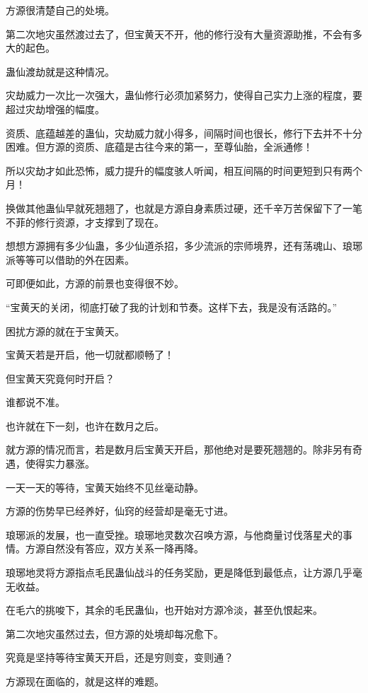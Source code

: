 \begin{this_body}
方源很清楚自己的处境。

第二次地灾虽然渡过去了，但宝黄天不开，他的修行没有大量资源助推，不会有多大的起色。

蛊仙渡劫就是这种情况。

灾劫威力一次比一次强大，蛊仙修行必须加紧努力，使得自己实力上涨的程度，要超过灾劫增强的幅度。

资质、底蕴越差的蛊仙，灾劫威力就小得多，间隔时间也很长，修行下去并不十分困难。但方源的资质、底蕴是古往今来的第一，至尊仙胎，全派通修！

所以灾劫才如此恐怖，威力提升的幅度骇人听闻，相互间隔的时间更短到只有两个月！

换做其他蛊仙早就死翘翘了，也就是方源自身素质过硬，还千辛万苦保留下了一笔不菲的修行资源，才支撑到了现在。

想想方源拥有多少仙蛊，多少仙道杀招，多少流派的宗师境界，还有荡魂山、琅琊派等等可以借助的外在因素。

可即便如此，方源的前景也变得很不妙。

“宝黄天的关闭，彻底打破了我的计划和节奏。这样下去，我是没有活路的。”

困扰方源的就在于宝黄天。

宝黄天若是开启，他一切就都顺畅了！

但宝黄天究竟何时开启？

谁都说不准。

也许就在下一刻，也许在数月之后。

就方源的情况而言，若是数月后宝黄天开启，那他绝对是要死翘翘的。除非另有奇遇，使得实力暴涨。

一天一天的等待，宝黄天始终不见丝毫动静。

方源的伤势早已经养好，仙窍的经营却是毫无寸进。

琅琊派的发展，也一直受挫。琅琊地灵数次召唤方源，与他商量讨伐落星犬的事情。方源自然没有答应，双方关系一降再降。

琅琊地灵将方源指点毛民蛊仙战斗的任务奖励，更是降低到最低点，让方源几乎毫无收益。

在毛六的挑唆下，其余的毛民蛊仙，也开始对方源冷淡，甚至仇恨起来。

第二次地灾虽然过去，但方源的处境却每况愈下。

究竟是坚持等待宝黄天开启，还是穷则变，变则通？

方源现在面临的，就是这样的难题。

\end{this_body}

